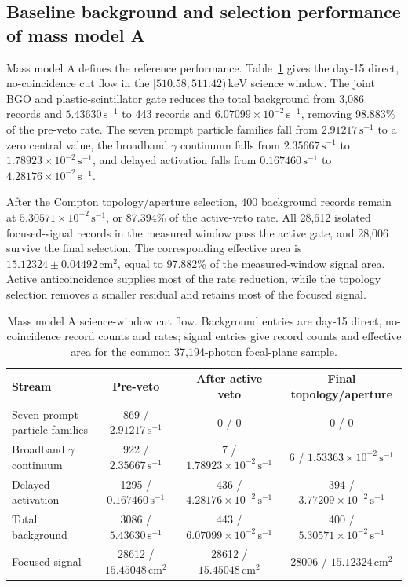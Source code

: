 \documentclass[11pt]{article}
\newcommand{\keV}{\ensuremath{\,\mathrm{keV}}}
\newcommand{\cps}{\ensuremath{\,\mathrm{s^{-1}}}}
\begin{document}
\subsection{Baseline background and selection performance of mass model A}
\label{subsec:model_a_baseline}
\label{subsec:reference_background_results}

Mass model A defines the reference performance. Table~\ref{tab:phase2_cutflow} gives the day-15 direct, no-coincidence cut flow in the $[510.58,511.42)\keV$ science window. The joint BGO and plastic-scintillator gate reduces the total background from 3,086 records and $5.43630\cps$ to 443 records and $6.07099\times10^{-2}\cps$, removing 98.883\% of the pre-veto rate. The seven prompt particle families fall from $2.91217\cps$ to a zero central value, the broadband $\gamma$ continuum falls from $2.35667\cps$ to $1.78923\times10^{-2}\cps$, and delayed activation falls from $0.167460\cps$ to $4.28176\times10^{-2}\cps$.

After the Compton topology/aperture selection, 400 background records remain at $5.30571\times10^{-2}\cps$, or 87.394\% of the active-veto rate. All 28,612 isolated focused-signal records in the measured window pass the active gate, and 28,006 survive the final selection. The corresponding effective area is $15.12324\pm0.04492\,\mathrm{cm^2}$, equal to 97.882\% of the measured-window signal area. Active anticoincidence supplies most of the rate reduction, while the topology selection removes a smaller residual and retains most of the focused signal.

\begin{table}[H]
\centering
\caption{Mass model A science-window cut flow. Background entries are day-15 direct, no-coincidence record counts and rates; signal entries give record counts and effective area for the common 37,194-photon focal-plane sample.}
\label{tab:phase2_cutflow}
\footnotesize
\begin{tabular}{lccc}
\toprule
Stream & Pre-veto & After active veto & Final topology/aperture \\
\midrule
Seven prompt particle families & 869 / $2.91217\cps$ & 0 / 0 & 0 / 0 \\
Broadband $\gamma$ continuum & 922 / $2.35667\cps$ & 7 / $1.78923\times10^{-2}\cps$ & 6 / $1.53363\times10^{-2}\cps$ \\
Delayed activation & 1295 / $0.167460\cps$ & 436 / $4.28176\times10^{-2}\cps$ & 394 / $3.77209\times10^{-2}\cps$ \\
Total background & 3086 / $5.43630\cps$ & 443 / $6.07099\times10^{-2}\cps$ & 400 / $5.30571\times10^{-2}\cps$ \\
Focused signal & 28612 / $15.45048\,\mathrm{cm^2}$ & 28612 / $15.45048\,\mathrm{cm^2}$ & 28006 / $15.12324\,\mathrm{cm^2}$ \\
\bottomrule
\end{tabular}
\end{table}
\end{document}
